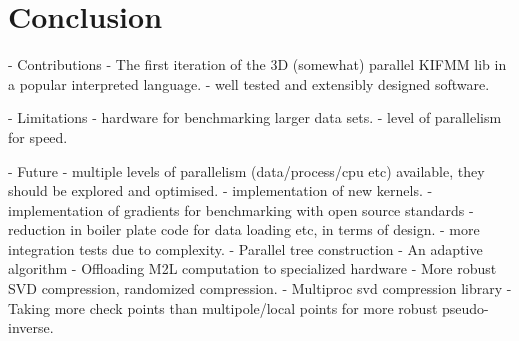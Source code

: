 \chapter{Conclusion}\label{chpt:conclusion}

- Contributions
    - The first iteration of the 3D (somewhat) parallel KIFMM lib in a popular interpreted language.
    - well tested and extensibly designed software.

- Limitations
    - hardware for benchmarking larger data sets.
    - level of parallelism for speed.

- Future
    - multiple levels of parallelism (data/process/cpu etc) available, they should be explored and optimised.
    - implementation of new kernels.
    - implementation of gradients for benchmarking with open source standards
    - reduction in boiler plate code for data loading etc, in terms of design.
    - more integration tests due to complexity.
    - Parallel tree construction
    - An adaptive algorithm
    - Offloading M2L computation to specialized hardware
    - More robust SVD compression, randomized compression.
    - Multiproc svd compression library
    - Taking more check points than multipole/local points for more robust pseudo-inverse.